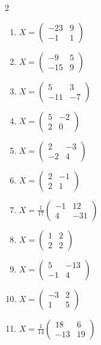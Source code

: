 \begin{multicols}{2}\raggedright
\begin{enumerate}[label=\arabic*., leftmargin=*, itemsep=1pt]
\item $X=\left(\begin{smallmatrix}-23 & 9\\ -1 & 1\end{smallmatrix}\right)$
\item $X=\left(\begin{smallmatrix}-9 & 5\\ -15 & 9\end{smallmatrix}\right)$
\item $X=\left(\begin{smallmatrix}5 & 3\\ -11 & -7\end{smallmatrix}\right)$
\item $X=\left(\begin{smallmatrix}5 & -2\\ 2 & 0\end{smallmatrix}\right)$
\item $X=\left(\begin{smallmatrix}2 & -3\\ -2 & 4\end{smallmatrix}\right)$
\item $X=\left(\begin{smallmatrix}2 & -1\\ 2 & 1\end{smallmatrix}\right)$
\item $X=\frac{1}{17}\left(\begin{smallmatrix}-1 & 12\\ 4 & -31\end{smallmatrix}\right)$
\item $X=\left(\begin{smallmatrix}1 & 2\\ 2 & 2\end{smallmatrix}\right)$
\item $X=\left(\begin{smallmatrix}5 & -13\\ -1 & 4\end{smallmatrix}\right)$
\item $X=\left(\begin{smallmatrix}-3 & 2\\ 1 & 5\end{smallmatrix}\right)$
\item $X=\frac{1}{14}\left(\begin{smallmatrix}18 & 6\\ -13 & 19\end{smallmatrix}\right)$

\end{enumerate}
\end{multicols}
